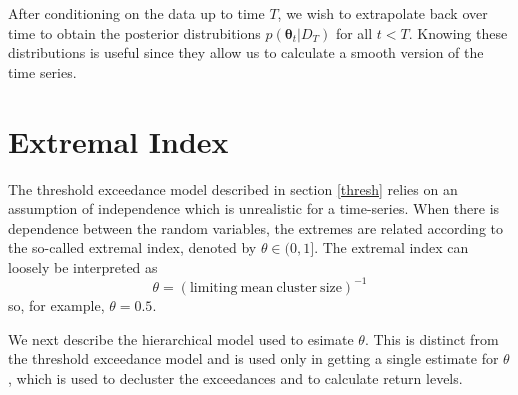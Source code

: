 \documentclass[12pt]{article}
\newcommand{\m}[1]{\mathbf{\bm{#1}}}
\begin{document}
After conditioning on the data up to time $T$, we wish to extrapolate back over time to obtain the posterior distrubitions $p(\m{\theta}_t|D_T)$ for all $t<T$. Knowing these distributions is useful since they allow us to calculate a smooth version of the time series.

% 
% 
% 
% 
 


\section{Extremal Index}
\label{index}

The threshold exceedance model described in section \ref{thresh} relies on an assumption of independence which is unrealistic for a time-series. When there is dependence between the random variables, the extremes are related according to the so-called extremal index, denoted by $\theta\in(0,1]$. The extremal index can loosely be interpreted as
\[ \theta = (\mathrm{limiting~mean~cluster~size})^{-1} \]
so, for example, $\theta=0.5$.

We next describe the hierarchical model used to esimate $\theta$. This is distinct from the threshold exceedance model and is used only in getting a single estimate for $\theta$, which is used to decluster the exceedances and to calculate return levels.
\end{document}
